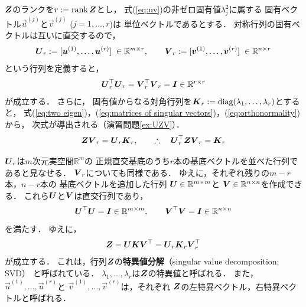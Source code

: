 
$\mbox{\boldmath $Z$}$のランクを$r:=\mathop{\textrm{rank}}\nolimits\mbox{\boldmath $Z$}$とし，
式(\ref{eq:uv})の非ゼロ固有値$\lambda_j^2$に属する
固有ベクトル$\vec u^{(j)}$と$\vec v^{(j)}$ ($j=1,\dots,r$)は
単位ベクトルであるとする．
対称行列の固有ベクトルは互いに直交するので，
\begin{equation}
\mbox{\boldmath $U$}_r:=[\mbox{\boldmath $u$}^{(1)},\dots,\mbox{\boldmath $u$}^{(r)}]\;\in\mathbb{R}^{m\times r}, \qquad
\mbox{\boldmath $V$}_r:=[\mbox{\boldmath $v$}^{(1)},\dots,\mbox{\boldmath $v$}^{(r)}]\;\in\mathbb{R}^{n\times r}
\label{eq:matrices of singular vectors}
\end{equation}
という行列を定義すると，
\begin{equation}
 \mbox{\boldmath $U$}_r^\top\mbox{\boldmath $U$}_r=\mbox{\boldmath $V$}_r^\top\mbox{\boldmath $V$}_r=\mbox{\boldmath $I$}\in\mathbb{R}^{r\times r}
\label{eq:orthonormality}
\end{equation}
が成立する．
さらに，
固有値からなる対角行列を$\mbox{\boldmath $K$}_r:=\mathop{\textrm{diag}}\nolimits(\lambda_1,\dots,\lambda_r)$とすると，
式(\ref{eq:two eigen})，(\ref{eq:matrices of singular vectors})，(\ref{eq:orthonormality})から，
次式が導出される（演習問題\ref{ex:UZV}）．
\begin{equation}
\mbox{\boldmath $Z$}\mbox{\boldmath $V$}_r=\mbox{\boldmath $U$}_r\mbox{\boldmath $K$}_r,\qquad
\therefore\quad
\mbox{\boldmath $U$}_r^\top\mbox{\boldmath $Z$}\mbox{\boldmath $V$}_r=\mbox{\boldmath $K$}_r
\label{eq:SVDr}
\end{equation}

$\mbox{\boldmath $U$}_r$は$m$次元実空間$\mathbb{R}^m$の
正規直交基底のうち$r$本の基底ベクトルを並べた行列であると見なせる．
$\mbox{\boldmath $V$}_r$についても同様である．
ゆえに，それぞれ残りの$m-r$本，$n-r$本の
基底ベクトルを追加した行列
$\mbox{\boldmath $U$}\in\mathbb{R}^{m\times m}$と
$\mbox{\boldmath $V$}\in\mathbb{R}^{n\times n}$を作成できる．
これら$\mbox{\boldmath $U$}$と$\mbox{\boldmath $V$}$は直交行列であり，
\begin{equation}
\mbox{\boldmath $U$}^\top\mbox{\boldmath $U$}=\mbox{\boldmath $I$}\in\mathbb{R}^{m\times m},\qquad
\mbox{\boldmath $V$}^\top\mbox{\boldmath $V$}=\mbox{\boldmath $I$}\in\mathbb{R}^{n\times n}
\label{eq:full orthonormality}
\end{equation}
を満たす．
ゆえに，
\begin{equation}
 \mbox{\boldmath $Z$}=\mbox{\boldmath $U$}\mbox{\boldmath $K$}\mbox{\boldmath $V$}^\top=\mbox{\boldmath $U$}_r\mbox{\boldmath $K$}_r\mbox{\boldmath $V$}_r^\top
\label{eq:SVD}
\end{equation}
が成立する．
これは，行列$\mbox{\boldmath $Z$}$の{\bf 特異値分解}（singular value decomposition; SVD）
と呼ばれている．
$\lambda_1,\dots,\lambda_r$は$\mbox{\boldmath $Z$}$の特異値と呼ばれる．
また，$\vec u^{(1)},\dots,\vec u^{(r)}$と
$\vec v^{(1)},\dots,\vec v^{(r)}$は，それぞれ
$\mbox{\boldmath $Z$}$の左特異ベクトル，右特異ベクトルと呼ばれる．





